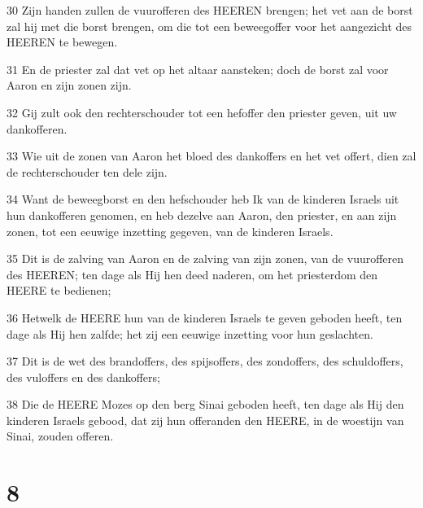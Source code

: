 \par 30 Zijn handen zullen de vuurofferen des HEEREN brengen; het vet aan de borst zal hij met die borst brengen, om die tot een beweegoffer voor het aangezicht des HEEREN te bewegen.
\par 31 En de priester zal dat vet op het altaar aansteken; doch de borst zal voor Aaron en zijn zonen zijn.
\par 32 Gij zult ook den rechterschouder tot een hefoffer den priester geven, uit uw dankofferen.
\par 33 Wie uit de zonen van Aaron het bloed des dankoffers en het vet offert, dien zal de rechterschouder ten dele zijn.
\par 34 Want de beweegborst en den hefschouder heb Ik van de kinderen Israels uit hun dankofferen genomen, en heb dezelve aan Aaron, den priester, en aan zijn zonen, tot een eeuwige inzetting gegeven, van de kinderen Israels.
\par 35 Dit is de zalving van Aaron en de zalving van zijn zonen, van de vuurofferen des HEEREN; ten dage als Hij hen deed naderen, om het priesterdom den HEERE te bedienen;
\par 36 Hetwelk de HEERE hun van de kinderen Israels te geven geboden heeft, ten dage als Hij hen zalfde; het zij een eeuwige inzetting voor hun geslachten.
\par 37 Dit is de wet des brandoffers, des spijsoffers, des zondoffers, des schuldoffers, des vuloffers en des dankoffers;
\par 38 Die de HEERE Mozes op den berg Sinai geboden heeft, ten dage als Hij den kinderen Israels gebood, dat zij hun offeranden den HEERE, in de woestijn van Sinai, zouden offeren.

\chapter{8}

